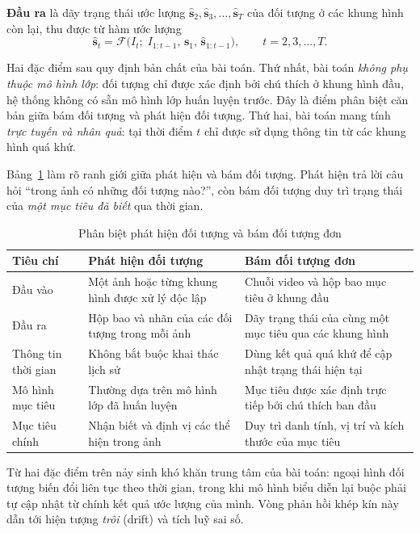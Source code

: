 \documentclass[12pt,a4paper]{article}
\numberwithin{equation}{section}
\begin{document}
\textbf{Đầu ra} là dãy trạng thái ước lượng $\hat{\mathbf{s}}_2, \hat{\mathbf{s}}_3, \dots,
\hat{\mathbf{s}}_T$ của đối tượng ở các khung hình còn lại, thu được từ hàm ước lượng
\begin{equation}
\hat{\mathbf{s}}_t = \mathcal{F}\big(I_t;\; I_{1:t-1},\, \mathbf{s}_1,\, \hat{\mathbf{s}}_{1:t-1}\big),
\qquad t = 2, 3, \dots, T .
\end{equation}

Hai đặc điểm sau quy định bản chất của bài toán. Thứ nhất, bài toán \textit{không phụ thuộc mô
hình lớp}: đối tượng chỉ được xác định bởi chú thích ở khung hình đầu, hệ thống không có sẵn mô
hình lớp huấn luyện trước. Đây là điểm phân biệt căn bản giữa bám đối tượng và phát hiện đối
tượng. Thứ hai, bài toán mang tính \textit{trực tuyến và nhân quả}: tại thời điểm $t$ chỉ được sử
dụng thông tin từ các khung hình quá khứ.

Bảng~\ref{tab:detection-tracking} làm rõ ranh giới giữa phát hiện và bám đối tượng. Phát hiện trả
lời câu hỏi ``trong ảnh có những đối tượng nào?'', còn bám đối tượng duy trì trạng thái của
\textit{một mục tiêu đã biết} qua thời gian.

\begin{table}[H]
\centering
\caption{Phân biệt phát hiện đối tượng và bám đối tượng đơn}
\label{tab:detection-tracking}
\small
\begin{tabular}{@{}p{3.0cm}p{5.1cm}p{5.4cm}@{}}
\toprule
\textbf{Tiêu chí} & \textbf{Phát hiện đối tượng} & \textbf{Bám đối tượng đơn} \\
\midrule
Đầu vào & Một ảnh hoặc từng khung hình được xử lý độc lập & Chuỗi video và hộp bao mục tiêu ở khung đầu \\
Đầu ra & Hộp bao và nhãn của các đối tượng trong mỗi ảnh & Dãy trạng thái của cùng một mục tiêu qua các khung hình \\
Thông tin thời gian & Không bắt buộc khai thác lịch sử & Dùng kết quả quá khứ để cập nhật trạng thái hiện tại \\
Mô hình mục tiêu & Thường dựa trên mô hình lớp đã huấn luyện & Mục tiêu được xác định trực tiếp bởi chú thích ban đầu \\
Mục tiêu chính & Nhận biết và định vị các thể hiện trong ảnh & Duy trì danh tính, vị trí và kích thước của mục tiêu \\
\bottomrule
\end{tabular}
\end{table}

Từ hai đặc điểm trên nảy sinh khó khăn trung tâm của bài toán: ngoại hình đối tượng biến đổi liên
tục theo thời gian, trong khi mô hình biểu diễn lại buộc phải tự cập nhật từ chính kết quả ước
lượng của mình. Vòng phản hồi khép kín này dẫn tới hiện tượng \textit{trôi} (drift) và tích luỹ
sai số.
\end{document}
